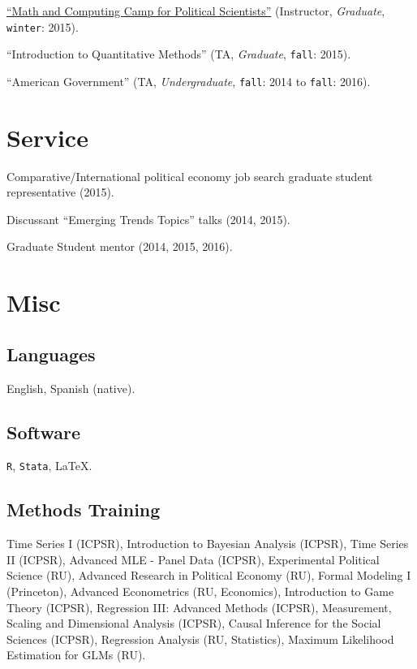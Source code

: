 \documentclass[letterpaper]{article}
\renewenvironment{itemize}{
  \begin{list}{}{
    \setlength{\leftmargin}{1.5em}
  }
}{
  \end{list}
}
\begin{document}
\begin{itemize}
\item \href{https://github.com/hbahamonde/Math-Camp/raw/master/Syllabus/Math_Camp_Syllabus.pdf/}{``Math and Computing Camp for Political Scientists''} (Instructor, \emph{Graduate}, \texttt{winter}: 2015).
\item ``Introduction to Quantitative Methods'' (TA, \emph{Graduate}, \texttt{fall}: 2015).
\item ``American Government'' (TA, \emph{Undergraduate}, \texttt{fall}: 2014 to \texttt{fall}: 2016).
\end{itemize}


\section*{Service}

\begin{itemize}
\item Comparative/International political economy job search graduate student representative (2015).
\item Discussant ``Emerging Trends Topics'' talks (2014, 2015).
\item Graduate Student mentor (2014, 2015, 2016).
\end{itemize}


\section*{Misc}

\subsection*{Languages}
English, Spanish (native).


\subsection*{Software}
\texttt{R}, \texttt{Stata}, \LaTeX.

\subsection*{Methods Training}
Time Series I (ICPSR), Introduction to Bayesian Analysis (ICPSR), Time Series II (ICPSR), Advanced MLE - Panel Data (ICPSR), Experimental Political Science (RU), Advanced Research in Political Economy (RU), Formal Modeling I (Princeton), Advanced Econometrics (RU, Economics), Introduction to Game Theory (ICPSR), Regression III: Advanced Methods (ICPSR), Measurement, Scaling and Dimensional Analysis (ICPSR), Causal Inference for the Social Sciences (ICPSR), Regression Analysis (RU, Statistics), Maximum Likelihood Estimation for GLMs (RU).




\bigskip
\end{document}

